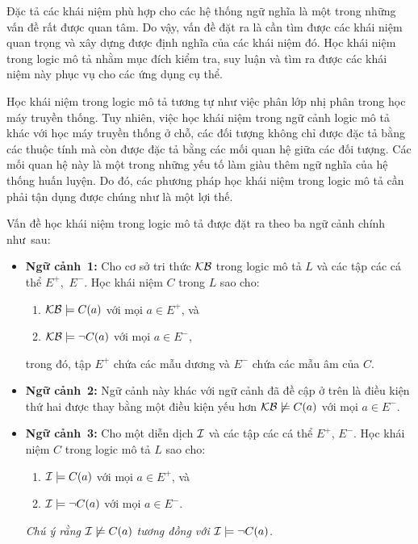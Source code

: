 Đặc tả các khái niệm phù hợp cho các hệ thống ngữ nghĩa là một trong những vấn đề rất được quan tâm. Do vậy, vấn đề đặt ra là cần tìm được các khái niệm quan trọng và xây dựng được định nghĩa của các khái niệm đó. Học khái niệm trong logic mô tả nhằm mục đích kiểm tra, suy luận và tìm ra được các khái niệm này phục vụ cho các ứng dụng cụ thể.

Học khái niệm trong logic mô tả tương tự như việc phân lớp nhị phân trong học máy truyền thống. Tuy nhiên, việc học khái niệm trong ngữ cảnh logic mô tả khác với học máy truyền thống ở chỗ, các đối tượng không chỉ được đặc tả bằng các thuộc tính mà còn được đặc tả bằng các mối quan hệ giữa các đối tượng. Các mối quan hệ này là một trong những yếu tố làm giàu thêm ngữ nghĩa của hệ thống huấn luyện. Do đó, các phương pháp học khái niệm trong logic mô tả cần phải tận dụng được chúng như là một lợi thế.

Vấn đề học khái niệm trong logic mô tả được đặt ra theo ba ngữ cảnh chính như~sau:
\vspace{-1.5ex}
\begin{itemize}
	\item\label{setting1}{\bf Ngữ cảnh~1:} Cho cơ sở tri thức $\mathcal{KB}$ trong logic mô tả $L$ và các tập các cá thể $E^+$,~$E^-$. Học khái niệm $C$ trong $L$ sao cho:
	\begin{enumerate}
		\item $\mathcal{KB} \models C(a)$ với mọi $a \in E^+$, và
		\item $\mathcal{KB} \models \lnot C(a)$ với mọi $a \in E^-$,
	\end{enumerate}
	\vspace{-1.0ex}
	trong đó, tập $E^+$ chứa các mẫu dương và $E^-$ chứa các mẫu âm của $C$.
	
	\item\label{setting2}{\bf Ngữ cảnh~2:} Ngữ cảnh này khác với ngữ cảnh đã đề cập ở trên là điều kiện thứ hai được thay bằng một điều kiện yếu hơn $\mathcal{KB} \not\models C(a)$ với mọi $a \in E^-$.
	
	\item\label{setting3}{\bf Ngữ cảnh~3:} Cho một diễn dịch $\mathcal{I}$ và các tập các cá thể $E^+$, $E^-$. Học khái niệm $C$ trong logic mô tả $L$ sao cho:
	\begin{enumerate}
		\item $\mathcal{I} \models C(a)$ với mọi $a \in E^+$, và
		\item $\mathcal{I} \models \lnot C(a)$ với mọi $a \in E^-$.
	\end{enumerate}
	\vspace{-1.0ex}
	{\em Chú ý rằng $\mathcal{I} \not\models C(a)$ tương đồng với $\mathcal{I} \models \lnot C(a)$.}
\end{itemize}
\vspace{-1.5ex}

